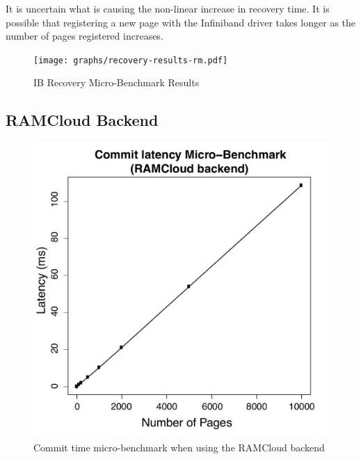 It is uncertain what is causing the non-linear increase in recovery time.
It is possible that registering a new page with the Infiniband driver takes
longer as the number of pages registered increases.

\begin{figure}[h]
    \caption{IB Recovery Micro-Benchmark Results}
    \texttt{[image: graphs/recovery-results-rm.pdf]}
    \label{fig:ib-recovery-ubm}
\end{figure}

\subsection{RAMCloud Backend}
\begin{figure}[t!]
\begin{center}
\includegraphics[scale=0.40]{graphs/commit_time_rc_latencies.pdf}
\end{center}
\caption{Commit time micro-benchmark when using the RAMCloud backend}
\label{fig:rc-commit-ubm}
\end{figure}

